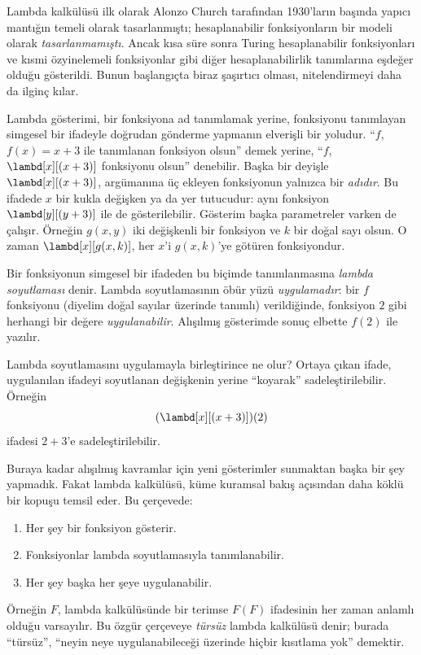 \documentclass[../../../include/open-logic-section]{subfiles}
\begin{document}

Lambda kalkülüsü ilk olarak Alonzo Church tarafından 1930'ların başında
yapıcı mantığın temeli olarak tasarlanmıştı; hesaplanabilir fonksiyonların
bir modeli olarak \emph{tasarlanmamıştı}. Ancak kısa süre sonra Turing
hesaplanabilir fonksiyonları ve kısmi özyinelemeli fonksiyonlar gibi diğer
hesaplanabilirlik tanımlarına eşdeğer olduğu gösterildi. Bunun başlangıçta
biraz şaşırtıcı olması, nitelendirmeyi daha da ilginç kılar.

Lambda gösterimi, bir fonksiyona ad tanımlamak yerine, fonksiyonu tanımlayan
simgesel bir ifadeyle doğrudan gönderme yapmanın elverişli bir yoludur.
``$f$, $f(x)=x+3$ ile tanımlanan fonksiyon olsun'' demek yerine, ``$f$,
$\lambd[x][(x+3)]$ fonksiyonu olsun'' denebilir. Başka bir deyişle
$\lambd[x][(x+3)]$, argümanına üç ekleyen fonksiyonun yalnızca bir
\emph{adıdır}. Bu ifadede $x$ bir kukla değişken ya da yer tutucudur: aynı
fonksiyon $\lambd[y][(y+3)]$ ile de gösterilebilir. Gösterim başka
parametreler varken de çalışır. Örneğin $g(x,y)$ iki değişkenli bir fonksiyon
ve $k$ bir doğal sayı olsun. O zaman $\lambd[x][g(x,k)]$, her $x$'i
$g(x,k)$'ye götüren fonksiyondur.

Bir fonksiyonun simgesel bir ifadeden bu biçimde tanımlanmasına
\emph{lambda soyutlaması} denir. Lambda soyutlamasının öbür yüzü
\emph{uygulamadır}: bir $f$ fonksiyonu (diyelim doğal sayılar üzerinde
tanımlı) verildiğinde, fonksiyon $2$ gibi herhangi bir değere
\emph{uygulanabilir}. Alışılmış gösterimde sonuç elbette $f(2)$ ile yazılır.

Lambda soyutlamasını uygulamayla birleştirince ne olur? Ortaya çıkan ifade,
uygulanılan ifadeyi soyutlanan değişkenin yerine ``koyarak'' sadeleştirilebilir.
Örneğin
\[
(\lambd[x][(x + 3)])(2)
\]
ifadesi $2+3$'e sadeleştirilebilir.

Buraya kadar alışılmış kavramlar için yeni gösterimler sunmaktan başka bir
şey yapmadık. Fakat lambda kalkülüsü, küme kuramsal bakış açısından daha
köklü bir kopuşu temsil eder. Bu çerçevede:
\begin{enumerate}
\item Her şey bir fonksiyon gösterir.
\item Fonksiyonlar lambda soyutlamasıyla tanımlanabilir.
\item Her şey başka her şeye uygulanabilir.
\end{enumerate}
Örneğin $F$, lambda kalkülüsünde bir terimse $F(F)$ ifadesinin her zaman
anlamlı olduğu varsayılır. Bu özgür çerçeveye \emph{türsüz} lambda kalkülüsü
denir; burada ``türsüz'', ``neyin neye uygulanabileceği üzerinde hiçbir
kısıtlama yok'' demektir.
\end{document}

